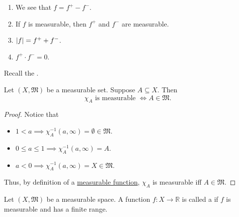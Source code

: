 \documentclass[notoc,notitlepage]{tufte-book}
\begin{document}
\begin{remark}
  \begin{enumerate}
    \item We see that $f = f^+ - f^-$.
    \item {}
      If $f$ is measurable, then $f^+$ and $f^-$ are measurable.
    \item $\left|f\right| = f^+ + f^-$.
    \item $f^+ \cdot f^- = 0$.
  \end{enumerate}
\end{remark}

Recall the .

\begin{propo}\label{propo:characteristic_function_of_measurable_sets_are_measurable}
  Let $(X, \mathfrak{M})$ be a measurable set. Suppose $A \subseteq X$.
  Then
  \begin{equation*}
    \chi_A \text{ is measurable } \iff A \in \mathfrak{M}.
  \end{equation*}
\end{propo}

\begin{proof}
  Notice that
  \begin{itemize}
    \item $1 < a \implies \chi_A^{-1}(a, \infty) = \emptyset \in \mathfrak{M}$.
    \item $0 \leq a \leq 1 \implies \chi_A^{-1}(a, \infty) = A$.
    \item $a < 0 \implies \chi_A^{-1}(a, \infty) = X \in \mathfrak{M}$.
  \end{itemize}
  Thus, by definition of a
  \hyperref[defn:measurable_functions]{measurable function},
  $\chi_A$ is measurable iff $A \in \mathfrak{M}$.
\end{proof}

\begin{defn}\label{defn:simple_function}
  Let $(X, \mathfrak{M})$ be a measurable space.
  A function $f : X \to \mathbb{R}$ is called a 
  if $f$ is measurable and has a finite range.
\end{defn}
\end{document}
